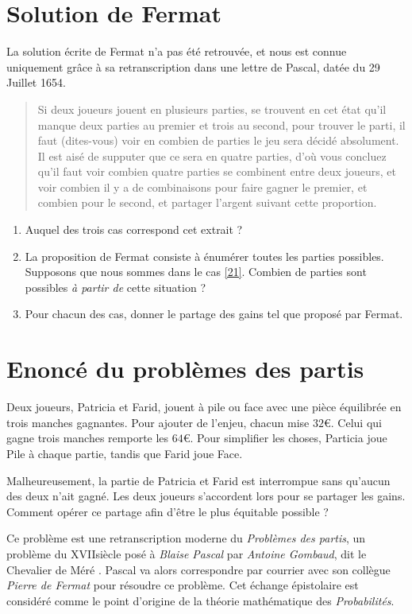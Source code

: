\documentclass{article}
\begin{document}
\section{Solution de Fermat}

La solution écrite de Fermat n'a pas été retrouvée, et nous est connue uniquement grâce à sa retranscription dans une lettre de Pascal, datée du 29 Juillet 1654.

\begin{quote}
\og Si deux joueurs jouent en plusieurs parties, se trouvent en cet état qu'il manque deux parties au premier et trois au second, pour trouver le parti, il faut (dites-vous) voir en combien de parties le jeu sera décidé absolument. Il est aisé de supputer que ce sera en quatre parties, d'où vous concluez qu'il faut voir combien quatre parties se combinent entre deux joueurs, et voir combien il y a de combinaisons pour faire gagner le premier, et combien pour le second, et partager l'argent suivant cette proportion. \fg 
\end{quote}

\begin{enumerate}[label=\textbf{Question \arabic*}\hfill]
\item Auquel des trois cas correspond cet extrait ?
\item La proposition de Fermat consiste à énumérer toutes les parties possibles. Supposons que nous sommes dans le cas \ref{21}. Combien de parties sont possibles \emph{à partir de} cette situation ?
\item Pour chacun des cas, donner le partage des gains tel que proposé par Fermat.
\end{enumerate}

\newpage
\setcounter{section}{0}

\maketitle
\section{Enoncé du problèmes des partis}
\begin{tcolorbox}
Deux joueurs, Patricia et Farid, jouent à pile ou face avec une pièce équilibrée en trois manches gagnantes. Pour ajouter de l'enjeu, chacun mise $32 €$. Celui qui gagne trois manches remporte les $64 €$. Pour simplifier les choses, Particia joue Pile à chaque partie, tandis que Farid joue Face.  

Malheureusement, la partie de Patricia et Farid est interrompue sans qu'aucun des deux n'ait gagné. Les deux joueurs s'accordent lors pour se partager les gains. Comment opérer ce partage afin d'être le plus équitable possible ?
\end{tcolorbox}
Ce problème est une retranscription moderne du \emph{Problèmes des partis}, un problème du \textsc{XVII}\ieme siècle posé à \emph{Blaise Pascal} par \emph{Antoine Gombaud}, dit \og le Chevalier de Méré \fg. Pascal va alors correspondre par courrier avec son collègue \emph{Pierre de Fermat} pour résoudre ce problème. Cet échange épistolaire est considéré comme le point d'origine de la théorie mathématique des \emph{Probabilités}.
\end{document}
